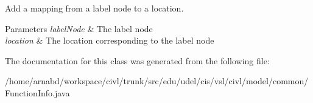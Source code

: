 Add a mapping from a label node to a location. 


\begin{DoxyParams}{Parameters}
{\em label\+Node} & The label node \\
\hline
{\em location} & The location corresponding to the label node \\
\hline
\end{DoxyParams}


The documentation for this class was generated from the following file\+:\begin{DoxyCompactItemize}
\item 
/home/arnabd/workspace/civl/trunk/src/edu/udel/cis/vsl/civl/model/common/Function\+Info.\+java\end{DoxyCompactItemize}
